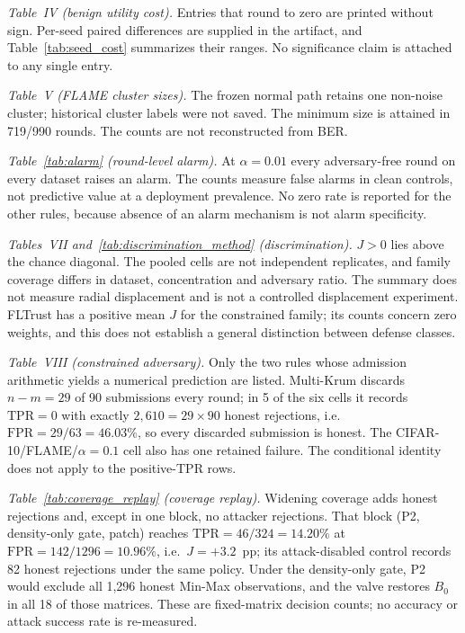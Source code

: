 \documentclass[journal]{IEEEtran}
\begin{document}
\emph{Table~IV (benign utility cost).} Entries that round to zero are printed without sign. Per-seed paired differences are supplied in the artifact, and Table~\ref{tab:seed_cost} summarizes their ranges. No significance claim is attached to any single entry.

\emph{Table~V (FLAME cluster sizes).} The frozen normal path retains one non-noise cluster; historical cluster labels were not saved. The minimum size is attained in 719/990 rounds. The counts are not reconstructed from BER.

\emph{Table~\ref{tab:alarm} (round-level alarm).} At $\alpha=0.01$ every adversary-free round on every dataset raises an alarm. The counts measure false alarms in clean controls, not predictive value at a deployment prevalence. No zero rate is reported for the other rules, because absence of an alarm mechanism is not alarm specificity.

\emph{Tables~VII and~\ref{tab:discrimination_method} (discrimination).} $J>0$ lies above the chance diagonal. The pooled cells are not independent replicates, and family coverage differs in dataset, concentration and adversary ratio. The summary does not measure radial displacement and is not a controlled displacement experiment. FLTrust has a positive mean $J$ for the constrained family; its counts concern zero weights, and this does not establish a general distinction between defense classes.

\emph{Table~VIII (constrained adversary).} Only the two rules whose admission arithmetic yields a numerical prediction are listed. Multi-Krum discards $n-m=29$ of 90 submissions every round; in 5 of the six cells it records $\mathrm{TPR}=0$ with exactly $2{,}610=29\times90$ honest rejections, i.e.\ $\mathrm{FPR}=29/63=46.03\%$, so every discarded submission is honest. The CIFAR-10/FLAME/$\alpha=0.1$ cell also has one retained failure. The conditional identity does not apply to the positive-TPR rows.

\emph{Table~\ref{tab:coverage_replay} (coverage replay).} Widening coverage adds honest rejections and, except in one block, no attacker rejections. That block (P2, density-only gate, patch) reaches $\mathrm{TPR}=46/324=14.20\%$ at $\mathrm{FPR}=142/1296=10.96\%$, i.e.\ $J=+3.2$~pp; its attack-disabled control records 82 honest rejections under the same policy. Under the density-only gate, P2 would exclude all 1{,}296 honest Min-Max observations, and the valve restores $B_0$ in all 18 of those matrices. These are fixed-matrix decision counts; no accuracy or attack success rate is re-measured.
\end{document}
